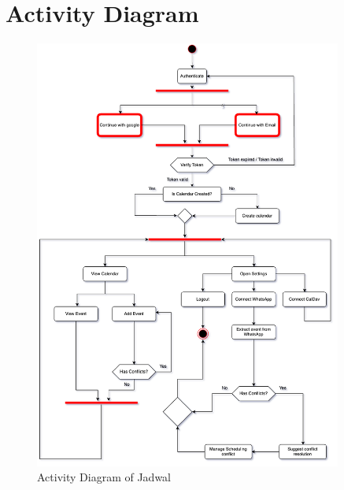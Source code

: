 \section{Activity Diagram}

\begin{figure}[!h]
    \centering
    \includegraphics[width=0.9\textwidth]{images/activity-diagram.png}
    \caption{Activity Diagram of Jadwal}
    \label{fig:activity-diagram}
\end{figure}

\newpage

